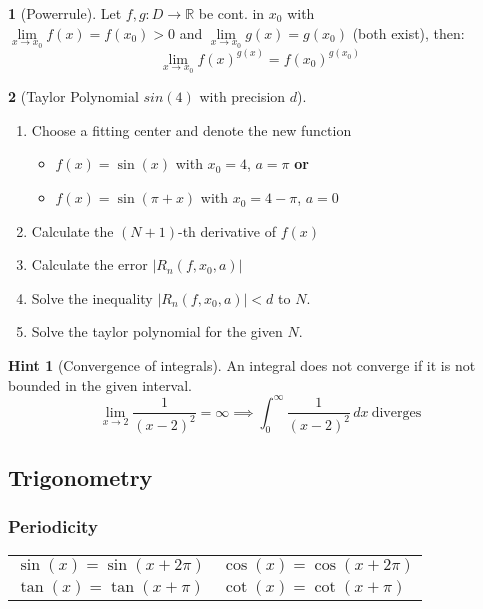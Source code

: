\documentclass[a4paper, 10pt]{article}
\theoremstyle{definition}
\newtheorem*{note_wrapper}{Hint}
\theoremstyle{ex}
\newtheorem*{exercise}{}
\theoremstyle{named}
\newenvironment{note}%
    {\begin{mdframed}[style=trick]\begin{note_wrapper}}%
    {\end{note_wrapper}\end{mdframed}}
\newcommand{\R}{\mathbb{R}}
\begin{document}
\begin{exercise}[Powerrule]
    Let $f, g: D \to \R$ be cont. in $x_0$ with \\
    $\lim\limits_{x \to x_0} f(x) = f(x_0) > 0$ and $\lim\limits_{x \to x_0} g(x) = g(x_0)$ (both exist), then:
    $$\lim_{x \to x_0} f(x)^{g(x)} = f(x_0)^{g(x_0)}$$
\end{exercise}

\begin{exercise}[Taylor Polynomial $sin(4)$ with precision $d$] $\,$
    \begin{enumerate}
        \item Choose a fitting center and denote the new function
        \begin{itemize}
            \item $f(x) = \sin(x)$ with $x_0 = 4$, $a = \pi$ \textbf{or}
            \item $f(x) = \sin(\pi + x)$ with $x_0 = 4 - \pi$, $a = 0$
        \end{itemize}
        \item Calculate the $(N + 1)$-th derivative of $f(x)$
        \item Calculate the error $|R_n(f,x_0,a)|$
        \item Solve the inequality $|R_n(f, x_0, a)| < d$ to $N$.
        \item Solve the taylor polynomial for the given $N$.
    \end{enumerate}
\end{exercise}

\begin{note}[Convergence of integrals]
    An integral does not converge if it is not bounded in the given interval.
    $$\lim_{x\to2} \frac{1}{(x-2)^2} = \infty \implies\int_0^\infty \frac{1}{(x-2)^2}\,dx \ \text{diverges}$$
\end{note}

\subsection*{Trigonometry}

\subsubsection*{Periodicity}
\begin{tabularx}{\linewidth}{XX}
    $\sin(x) = \sin(x + 2 \pi)$ & $\cos(x) = \cos(x + 2\pi)$ \\
    $\tan(x) = \tan(x + \pi)$ & $\cot(x) = \cot(x + \pi)$
\end{tabularx}
\end{document}
